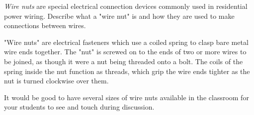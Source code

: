 

{\it Wire nuts} are special electrical connection devices commonly used in residential power wiring.  Describe what a "wire nut" is and how they are used to make connections between wires.







"Wire nuts" are electrical fasteners which use a coiled spring to clasp bare metal wire ends together.  The "nut" is screwed on to the ends of two or more wires to be joined, as though it were a nut being threaded onto a bolt.  The coils of the spring inside the nut function as threads, which grip the wire ends tighter as the nut is turned clockwise over them.







It would be good to have several sizes of wire nuts available in the classroom for your students to see and touch during discussion.




